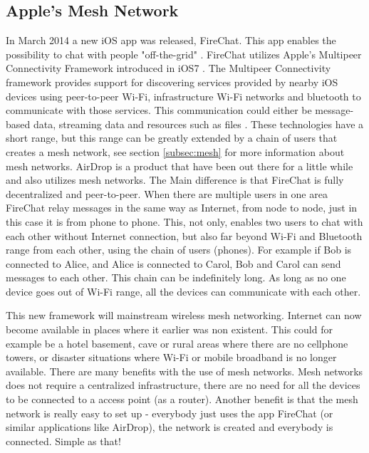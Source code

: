 \subsection{Apple's Mesh Network}
In March 2014 a new iOS app was released, FireChat. This app enables the possibility to chat with people "off-the-grid" \cite{fireChat}. FireChat utilizes Apple's Multipeer Connectivity Framework introduced in iOS7 \cite{appleMesh}. The Multipeer Connectivity framework provides support for discovering services provided by nearby iOS devices using peer-to-peer Wi-Fi, infrastructure Wi-Fi networks and bluetooth to communicate with those services. This communication could either be message-based data, streaming data and resources such as files \cite{multipeer}. These technologies have a short range, but this range can be greatly extended by a chain of users that creates a mesh network, see section \ref{subsec:mesh} for more information about mesh networks. AirDrop is a product that have been out there for a little while and also utilizes mesh networks. The Main difference is that FireChat is fully decentralized and peer-to-peer. When there are multiple users in one area FireChat relay messages in the same way as Internet, from node to node, just in this case it is from phone to phone.  This, not only, enables two users to chat with each other without Internet connection, but also far beyond Wi-Fi and Bluetooth range from each other, using the chain of users (phones). For example if Bob is connected to Alice, and Alice is connected to Carol, Bob and Carol can send messages to each other. This chain can be indefinitely long. As long as no one device goes out of Wi-Fi range, all the devices can communicate with each other. 

This new framework will mainstream wireless mesh networking. Internet can now become available in places where it earlier was non existent. This could for example be a hotel basement, cave or rural areas where there are no cellphone towers, or disaster situations where Wi-Fi or mobile broadband  is no longer available. There are many benefits with the use of mesh networks. Mesh networks does not require a centralized infrastructure, there are no need for all the devices to be connected to a access point (as a router). Another benefit is that the mesh network is really easy to set up - everybody just uses the app FireChat (or similar applications like AirDrop), the network is created and everybody is connected. Simple as that! 

